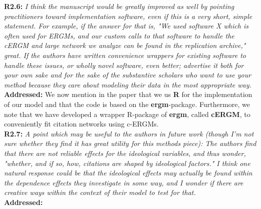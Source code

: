 \documentclass[a4paper,11pt]{texMemo}
\begin{document}
\noindent \textbf{R2.6:} \emph{ I think the manuscript would be greatly improved as well by pointing practitioners toward implementation software, even if this is a very short, simple statement. For example, if the answer for that is, "We used software X which is often used for ERGMs, and our custom calls to that software to handle the cERGM and large network we analyze can be found in the replication archive," great. If the authors have written convenience wrappers for existing software to handle these issues, or wholly novel software, even better; advertise it both for your own sake and for the sake of the substantive scholars who want to use your method because they care about modeling their data in the most appropriate way.}\\

\noindent \textbf{Addressed:} We now mention in the paper that we us \textbf{R} for the implementation of our model and that the code is based on the \textbf{ergm}-package. Furthermore, we note that we have developed a wrapper R-package of \textbf{ergm}, called \textbf{cERGM}, to conveniently fit citation networks using c-ERGMs.  \\

\noindent \textbf{R2.7:} \emph{ A point which may be useful to the authors in future work (though I'm not sure whether they find it has great utility for this methods piece): The authors find that there are not reliable effects for the ideological variables, and thus wonder, "whether, and if so, how, citations are shaped by ideological factors." I think one natural response could be that the ideological effects may actually be found within the dependence effects they investigate in some way, and I wonder if there are creative ways within the context of their model to test for that.}\\

\noindent \textbf{Addressed:}  \\


\printbibliography
\end{document}
